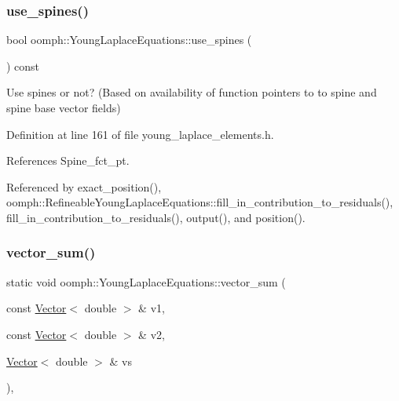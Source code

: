 \mbox{\label{classoomph_1_1YoungLaplaceEquations_aaf07cfa70e0de1b388290d2e1f63a7b7}} 
\subsubsection{\texorpdfstring{use\+\_\+spines()}{use\_spines()}}
{\footnotesize\ttfamily bool oomph\+::\+Young\+Laplace\+Equations\+::use\+\_\+spines (\begin{DoxyParamCaption}{ }\end{DoxyParamCaption}) const\hspace{0.3cm}{\ttfamily [inline]}}



Use spines or not? (Based on availability of function pointers to to spine and spine base vector fields) 



Definition at line 161 of file young\+\_\+laplace\+\_\+elements.\+h.



References Spine\+\_\+fct\+\_\+pt.



Referenced by exact\+\_\+position(), oomph\+::\+Refineable\+Young\+Laplace\+Equations\+::fill\+\_\+in\+\_\+contribution\+\_\+to\+\_\+residuals(), fill\+\_\+in\+\_\+contribution\+\_\+to\+\_\+residuals(), output(), and position().

\mbox{\label{classoomph_1_1YoungLaplaceEquations_afb7ff7fc54e453324abdd29565ba8599}} 
\subsubsection{\texorpdfstring{vector\+\_\+sum()}{vector\_sum()}}
{\footnotesize\ttfamily static void oomph\+::\+Young\+Laplace\+Equations\+::vector\+\_\+sum (\begin{DoxyParamCaption}\item[{const \hyperlink{classoomph_1_1Vector}{Vector}$<$ double $>$ \&}]{v1,  }\item[{const \hyperlink{classoomph_1_1Vector}{Vector}$<$ double $>$ \&}]{v2,  }\item[{\hyperlink{classoomph_1_1Vector}{Vector}$<$ double $>$ \&}]{vs }\end{DoxyParamCaption})\hspace{0.3cm}{\ttfamily [inline]}, {\ttfamily [static]}}



